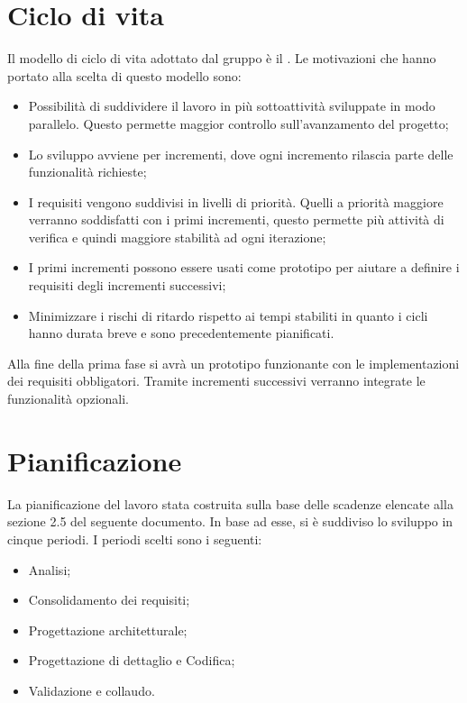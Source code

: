 \documentclass[../PianodiProgetto.tex]{subfiles}
\begin{document}
	\chapter{Ciclo di vita}

	Il modello di ciclo di vita adottato dal gruppo è il . Le motivazioni che hanno portato alla scelta di questo modello sono:
	\begin{itemize}
		\item Possibilità di suddividere il lavoro in più sottoattività sviluppate in modo parallelo. Questo permette maggior controllo sull’avanzamento del progetto;
		\item Lo sviluppo avviene per incrementi, dove ogni incremento rilascia parte delle funzionalità richieste;
		\item I requisiti vengono suddivisi in livelli di priorità. Quelli a priorità maggiore verranno soddisfatti con i primi incrementi, questo permette più attività di verifica e quindi maggiore stabilità ad ogni iterazione;
		\item I primi incrementi possono essere usati come prototipo per aiutare a definire i requisiti degli incrementi successivi;
		\item Minimizzare i rischi di ritardo rispetto ai tempi stabiliti in quanto i cicli hanno durata breve e sono precedentemente pianificati.
	\end{itemize}
	Alla fine della prima fase si avrà un prototipo funzionante con le implementazioni dei requisiti obbligatori. Tramite incrementi successivi verranno integrate le funzionalità opzionali.
	
	\chapter{Pianificazione}
	
	La pianificazione del lavoro stata costruita sulla base delle scadenze elencate alla sezione 2.5 del seguente documento. In base ad esse, si è suddiviso lo sviluppo in cinque periodi. I periodi scelti sono i seguenti:
	\begin{itemize}
		\item Analisi;
		\item Consolidamento dei requisiti;
		\item Progettazione architetturale;
		\item Progettazione di dettaglio e Codifica;
		\item Validazione e collaudo.
	\end{itemize}
\end{document}
